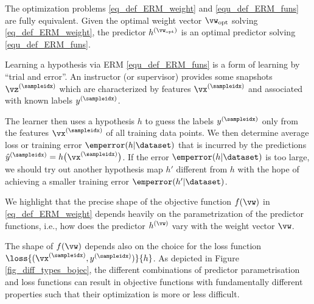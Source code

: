 \documentclass[12pt]{report}
\begin{document}
The optimization problems \eqref{eq_def_ERM_weight} and \eqref{equ_def_ERM_funs} 
are fully equivalent. Given the optimal weight vector $\vw_{\rm opt}$ solving 
\eqref{eq_def_ERM_weight}, the predictor $h^{(\vw_{\rm opt})}$ is 
an optimal predictor solving \eqref{equ_def_ERM_funs}. 

Learning a hypothesis via ERM \eqref{equ_def_ERM_funs} is a form of 
learning by ``trial and error''. An instructor (or supervisor) provides some 
snapshots $\vz^{(\sampleidx)}$ which are characterized by features 
$\vx^{(\sampleidx)}$ and associated with known labels $y^{(\sampleidx)}$. 

The learner then uses a hypothesis $h$ to guess the labels $y^{(\sampleidx)}$ 
only from the features $\vx^{(\sampleidx)}$ of all training data points. We then 
determine average loss or training error $\emperror(h|\dataset)$ that is incurred 
by the predictions $\hat{y}^{(\sampleidx)} = h\big( \vx^{(\sampleidx)} \big)$. 
If the error $\emperror(h|\dataset)$ is too large, we should try out another  
hypothesis map $h'$ different from $h$ with the hope of achieving a smaller 
training error $\emperror(h'|\dataset)$. 

%

We highlight that the precise shape of the objective function 
$f(\vw)$ in \eqref{eq_def_ERM_weight} depends heavily on the 
parametrization of the predictor functions, i.e., how does the 
predictor $h^{(\vw)}$ vary with the weight vector $\vw$. 

The shape of $f(\vw)$ depends also on the choice for the loss 
function $\loss{(\vx^{(\sampleidx)},y^{(\sampleidx)})}{h}$. As 
depicted in Figure \ref{fig_diff_types_bojec}, the different combinations 
of predictor parametrisation and loss functions can result in objective 
functions with fundamentally different properties such that their 
optimization is more or less difficult. 
\end{document}
